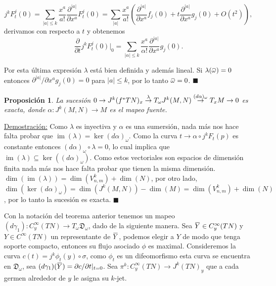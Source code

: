\documentclass{report}
\newtheorem{prop}[theorem]{Proposici\'on}
\theoremstyle{definition}
\DeclareMathOperator{\im}{im}
\newcommand{\overbar}[1]{\mkern 1.5mu\overline{\mkern-1.5mu#1\mkern-1.5mu}\mkern 1.5mu}
\begin{document}
$$j^k F_t^j (0) = \sum\limits_{\vert a \vert \leq k}  \frac{x^a}{a !} \frac{\partial^{\vert a \vert}}{\partial x^a} F_t^j (0) = \sum\limits_{\vert a \vert} \frac{x^a}{a !} \left( \frac{\partial^{\vert a \vert}}{\partial x^a} f_j (0)        + t \frac{\partial^{\vert a \vert}}{\partial x^a} g_j (0) + O(t^2)\right) ,$$ derivamos con respecto a $t$ y obtenemos 
$$\frac{\partial}{\partial t} j^k F_t^j (0)\vert_0 = \sum\limits_{\vert \alpha \vert \leq k} \frac{x^a}{\alpha !} \frac{\partial^{\vert a \vert}}{\partial x^a} g_j (0) .$$

Por esta \'ultima expresi\'on $\lambda$ est\'a bien definida y adem\'as lineal. Si $\lambda (\overbar{\omega})= 0$ entonces $\partial^{\vert a \vert} / \partial x^a g_j(0)=0$ para $\vert a \vert \leq k$, por lo tanto $\overbar{\omega} = 0$. $\blacksquare$

\begin{prop}
La sucesi\'on $0 \to J^k(f^\ast TN)_x \overset{\lambda}{\to} T_{\omega}J^k (M,N) \overset{(d \alpha)_\omega}{\to} \\ T_x M \to 0$ es exacta, donde $\alpha: J^k (M,N) \to M$ es el mapeo fuente.
\end{prop}

\underline{Demostraci\'on:} Como $\lambda$ es inyectiva y $\alpha$ es una sumersi\'on, nada m\'as nos hace falta probar que $\im (\lambda) = \ker (d \alpha)_\omega$. Como la curva $t \to \alpha \circ j^k F_t (p)$ es constante entonces $(d\alpha)_\omega \circ \lambda = 0$, lo cual implica que $\im (\lambda) \subseteq \ker((d\alpha)_\omega)$. Como estos vectoriales son espacios de dimensi\'on finita nada m\'as nos hace falta probar que tienen la misma dimensi\'on. $\dim (\im (\lambda)) = \dim (V^k_{n,m}) + \dim (N)$, por otro lado, $\dim (\ker (d\alpha)_\omega) = \dim (J^k(M,N)) - \dim( M) = \dim (V^k_{n,m}) + \dim (N)$, por lo tanto la sucesi\'on es exacta. $\blacksquare$

Con la notaci\'on del teorema anterior tenemos un mapeo $(d \gamma_1 ): C^\infty_y (TN) \to T_\omega \mathfrak{D}_\omega$, dado de la siguiente manera. Sea $\overbar{Y} \in C^\infty_y (TN) $ y $Y \in C^\infty (TN)$ un representante de $\overbar{Y}$, podemos elegir a $Y$ de modo que tenga soporte compacto, entonces su flujo asociado $\phi$ es maximal. Consideremos la curva $c(t) = j^k \phi_t (y) \circ \sigma$, como $\phi_t$ es un difeomorfismo esta curva se encuentra en $\mathfrak{D}_\omega$, sea $(d\gamma_1) (\overbar{Y}) = \partial c / \partial t \vert_{t=0}$. Sea $\pi^k : C^\infty_y (TN) \to J^k (TN)_y$ que a cada germen alrededor de $y$ le asigna su $k$-jet.
\end{document}
